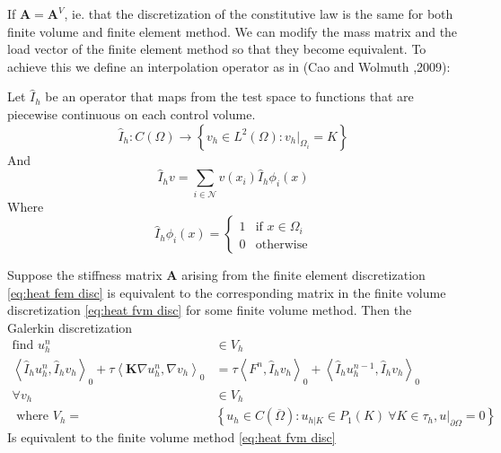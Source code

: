 \documentclass[../Main/main.tex]{subfiles}
\begin{document}
	If $\pmb{A}= \pmb{A}^V$, ie. that the discretization of the constitutive law is the same for both finite volume and finite element method. We can modify  the mass matrix and the load vector of the finite element method so that they become equivalent. To achieve this we define an interpolation operator as in (Cao and Wolmuth \cite{https://doi.org/10.1002/fld.1926},2009):
	\begin{definition}
		Let $\hat{I}_h$ be an operator that maps from the test space to functions that are piecewise continuous on each control volume.
		\begin{equation*}
			\hat{I}_h:C(\Omega)\rightarrow \left \{ v_h \in L^2(\Omega):v_h|_{\Omega_i} = K \right \}
		\end{equation*}
		And
		\begin{equation*}
			\hat{I}_h v = \sum_{i\in \mathcal{N}}v(x_i)\hat{I}_h\phi_i(x)
		\end{equation*}
		Where
		\begin{equation}
			\hat{I}_h\phi_i(x)=\left\{\begin{matrix}
				1 & \text{if } x\in \Omega_i\\ 
				0 & \text{otherwise}
			\end{matrix}\right.
		\end{equation}
	\end{definition}
	\begin{lemma}
		Suppose the stiffness matrix $\pmb{A}$ arising from the finite element discretization \eqref{eq:heat fem disc} is equivalent to the corresponding matrix in the finite volume discretization \eqref{eq:heat fvm disc} for some finite volume method. Then the Galerkin discretization 
		\begin{equation}\label{eq:lemma mass}
			\begin{aligned}
			\text{find }u_h^n &\in V_h\\
			\left \langle \hat{I}_h u_h^n,\hat{I}_h v_h \right \rangle_0 +\tau \left \langle  \pmb{K} \nabla u^n_h, \nabla v_h \right \rangle_0 &= \tau \left \langle F^n,\hat{I}_h v_h \right \rangle_0 + \left \langle \hat{I}_h u_h^{n-1},\hat{I}_h v_h \right \rangle_0 \\
			\forall v_h &\in V_h \\ 
			\text{ where } V_h = &\left \{ u_h \in C(\overline{\Omega}) : u_{h|K} \in P_1(K) \ \forall K \in \tau_h, u|_{\partial \Omega} = 0  \right \}
			\end{aligned}
		\end{equation}
		Is equivalent to the finite volume method \eqref{eq:heat fvm disc}
	\end{lemma}
\end{document}
